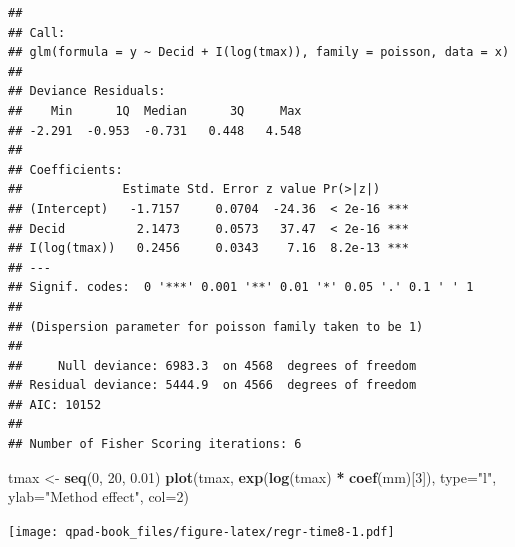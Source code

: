 \documentclass[12pt,]{book}
\newenvironment{Shaded}{\begin{snugshade}}{\end{snugshade}}
\newcommand{\DataTypeTok}[1]{\textcolor[rgb]{0.13,0.29,0.53}{#1}}
\newcommand{\DecValTok}[1]{\textcolor[rgb]{0.00,0.00,0.81}{#1}}
\newcommand{\FloatTok}[1]{\textcolor[rgb]{0.00,0.00,0.81}{#1}}
\newcommand{\KeywordTok}[1]{\textcolor[rgb]{0.13,0.29,0.53}{\textbf{#1}}}
\newcommand{\NormalTok}[1]{#1}
\newcommand{\OperatorTok}[1]{\textcolor[rgb]{0.81,0.36,0.00}{\textbf{#1}}}
\newcommand{\StringTok}[1]{\textcolor[rgb]{0.31,0.60,0.02}{#1}}
\begin{document}
\begin{Shaded}
\end{Shaded}

\begin{verbatim}
## 
## Call:
## glm(formula = y ~ Decid + I(log(tmax)), family = poisson, data = x)
## 
## Deviance Residuals: 
##    Min      1Q  Median      3Q     Max  
## -2.291  -0.953  -0.731   0.448   4.548  
## 
## Coefficients:
##              Estimate Std. Error z value Pr(>|z|)    
## (Intercept)   -1.7157     0.0704  -24.36  < 2e-16 ***
## Decid          2.1473     0.0573   37.47  < 2e-16 ***
## I(log(tmax))   0.2456     0.0343    7.16  8.2e-13 ***
## ---
## Signif. codes:  0 '***' 0.001 '**' 0.01 '*' 0.05 '.' 0.1 ' ' 1
## 
## (Dispersion parameter for poisson family taken to be 1)
## 
##     Null deviance: 6983.3  on 4568  degrees of freedom
## Residual deviance: 5444.9  on 4566  degrees of freedom
## AIC: 10152
## 
## Number of Fisher Scoring iterations: 6
\end{verbatim}

\begin{Shaded}
\begin{Highlighting}[]
\NormalTok{tmax <-}\StringTok{ }\KeywordTok{seq}\NormalTok{(}\DecValTok{0}\NormalTok{, }\DecValTok{20}\NormalTok{, }\FloatTok{0.01}\NormalTok{)}
\KeywordTok{plot}\NormalTok{(tmax, }\KeywordTok{exp}\NormalTok{(}\KeywordTok{log}\NormalTok{(tmax) }\OperatorTok{*}\StringTok{ }\KeywordTok{coef}\NormalTok{(mm)[}\DecValTok{3}\NormalTok{]), }\DataTypeTok{type=}\StringTok{"l"}\NormalTok{,}
  \DataTypeTok{ylab=}\StringTok{"Method effect"}\NormalTok{, }\DataTypeTok{col=}\DecValTok{2}\NormalTok{)}
\end{Highlighting}
\end{Shaded}

\texttt{[image: qpad-book\_files/figure-latex/regr-time8-1.pdf]}
\end{document}
